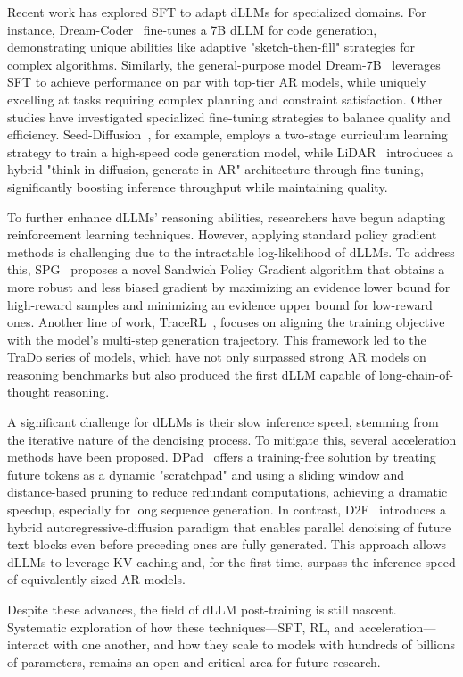Recent work has explored SFT to adapt dLLMs for specialized domains. For instance, Dream-Coder~\citep{xie_dream-coder_2025} fine-tunes a 7B dLLM for code generation, demonstrating unique abilities like adaptive "sketch-then-fill" strategies for complex algorithms. Similarly, the general-purpose model Dream-7B~\citep{Dream7B2025} leverages SFT to achieve performance on par with top-tier AR models, while uniquely excelling at tasks requiring complex planning and constraint satisfaction. Other studies have investigated specialized fine-tuning strategies to balance quality and efficiency. Seed-Diffusion~\citep{song2025seed}, for example, employs a two-stage curriculum learning strategy to train a high-speed code generation model, while LiDAR~\citep{liu_tidar_2025} introduces a hybrid "think in diffusion, generate in AR" architecture through fine-tuning, significantly boosting inference throughput while maintaining quality.

To further enhance dLLMs' reasoning abilities, researchers have begun adapting reinforcement learning techniques. However, applying standard policy gradient methods is challenging due to the intractable log-likelihood of dLLMs. To address this, SPG~\citep{wang2025spg} proposes a novel Sandwich Policy Gradient algorithm that obtains a more robust and less biased gradient by maximizing an evidence lower bound for high-reward samples and minimizing an evidence upper bound for low-reward ones. Another line of work, TraceRL~\citep{wang2025revolutionizing}, focuses on aligning the training objective with the model's multi-step generation trajectory. This framework led to the TraDo series of models, which have not only surpassed strong AR models on reasoning benchmarks but also produced the first dLLM capable of long-chain-of-thought reasoning.

A significant challenge for dLLMs is their slow inference speed, stemming from the iterative nature of the denoising process. To mitigate this, several acceleration methods have been proposed. DPad~\citep{chen_dpad_2025} offers a training-free solution by treating future tokens as a dynamic "scratchpad" and using a sliding window and distance-based pruning to reduce redundant computations, achieving a dramatic speedup, especially for long sequence generation. In contrast, D2F~\citep{wang_diffusion_2025} introduces a hybrid autoregressive-diffusion paradigm that enables parallel denoising of future text blocks even before preceding ones are fully generated. This approach allows dLLMs to leverage KV-caching and, for the first time, surpass the inference speed of equivalently sized AR models.

Despite these advances, the field of dLLM post-training is still nascent. Systematic exploration of how these techniques—SFT, RL, and acceleration—interact with one another, and how they scale to models with hundreds of billions of parameters, remains an open and critical area for future research.
